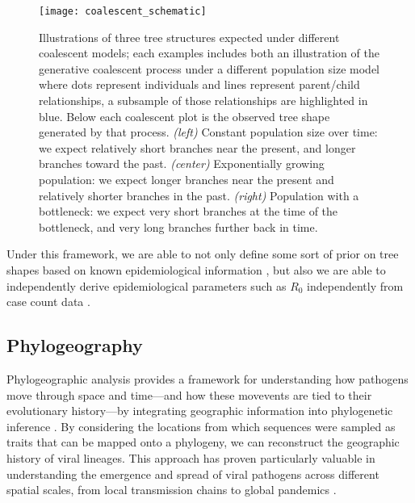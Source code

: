 \begin{figure}[ht]
  \centering
  \texttt{[image: coalescent\_schematic]}
  \caption[Demography effects tree shape]{Illustrations of three tree structures expected under different coalescent models; each examples includes both an illustration of the generative coalescent process under a different population size model where dots represent individuals and lines represent parent/child relationships, a subsample of those relationships are highlighted in blue. Below each coalescent plot is the observed tree shape generated by that process. \textit{(left)} Constant population size over time: we expect relatively short branches near the present, and longer branches toward the past. \textit{(center)} Exponentially growing population: we expect longer branches near the present and relatively shorter branches in the past. \textit{(right)} Population with a bottleneck: we expect very short branches at the time of the bottleneck, and very long branches further back in time.
  }
  \label{fig:coalescentOverview}
\end{figure}

Under this framework, we are able to not only define some sort of prior on tree shapes based on known epidemiological information \citep{liu2009coalescent,hill2019bayesian}, but also we are able to independently derive epidemiological parameters such as $R_0$ independently from case count data \citep{frost2010viral,volz2013viral}.

\subsection{Phylogeography}\label{ssec:phylogeography}
Phylogeographic analysis provides a framework for understanding how pathogens move through space and time---and how these movevents are tied to their evolutionary history---by integrating geographic information into phylogenetic inference \citep{holmes2008evolutionary}.
By considering the locations from which sequences were sampled as traits that can be mapped onto a phylogeny, we can reconstruct the geographic history of viral lineages.
This approach has proven particularly valuable in understanding the emergence and spread of viral pathogens across different spatial scales, from local transmission chains to global pandemics \citep{bourhy2008origin,cuevas2012phylogeography,black2019genomic,truong2022phylodynamics,du2021establishment}.

